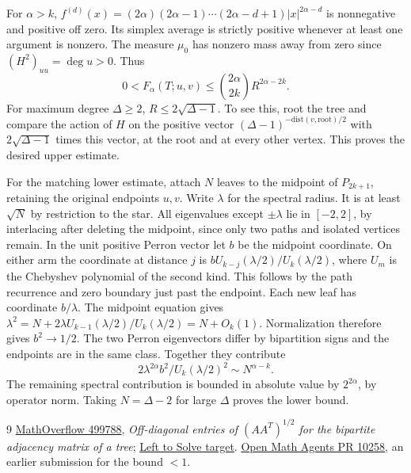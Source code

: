 \documentclass[11pt]{article}
\begin{document}
For $\alpha>k$, $f^{(d)}(x)=(2\alpha)(2\alpha-1)\cdots(2\alpha-d+1)|x|^{2\alpha-d}$ is nonnegative and positive off zero. Its simplex average is strictly positive whenever at least one argument is nonzero. The measure $\mu_0$ has nonzero mass away from zero since $(H^2)_{uu}=\deg u>0$. Thus
\[
 0<F_\alpha(T;u,v)\le {2\alpha\choose 2k} R^{2\alpha-2k}.
\]
For maximum degree $\Delta\ge2$, $R\le2\sqrt{\Delta-1}$. To see this, root the tree and compare the action of $H$ on the positive vector $(\Delta-1)^{-\mathrm{dist}(v,\mathrm{root})/2}$ with $2\sqrt{\Delta-1}$ times this vector, at the root and at every other vertex. This proves the desired upper estimate.

For the matching lower estimate, attach $N$ leaves to the midpoint of $P_{2k+1}$, retaining the original endpoints $u,v$. Write $\lambda$ for the spectral radius. It is at least $\sqrt N$ by restriction to the star. All eigenvalues except $\pm\lambda$ lie in $[-2,2]$, by interlacing after deleting the midpoint, since only two paths and isolated vertices remain. In the unit positive Perron vector let $b$ be the midpoint coordinate. On either arm the coordinate at distance $j$ is $b U_{k-j}(\lambda/2)/U_k(\lambda/2)$, where $U_m$ is the Chebyshev polynomial of the second kind. This follows by the path recurrence and zero boundary just past the endpoint. Each new leaf has coordinate $b/\lambda$. The midpoint equation gives $\lambda^2=N+2\lambda U_{k-1}(\lambda/2)/U_k(\lambda/2)=N+O_k(1)$. Normalization therefore gives $b^2\to1/2$. The two Perron eigenvectors differ by bipartition signs and the endpoints are in the same class. Together they contribute
\[
 2\lambda^{2\alpha} b^2/U_k(\lambda/2)^2\sim N^{\alpha-k}.
\]
The remaining spectral contribution is bounded in absolute value by $2^{2\alpha}$, by operator norm. Taking $N=\Delta-2$ for large $\Delta$ proves the lower bound.
\begin{thebibliography}{9}
 \href{https://mathoverflow.net/questions/499788}{MathOverflow 499788}, \emph{Off-diagonal entries of $(AA^T)^{1/2}$ for the bipartite adjacency matrix of a tree}; \href{https://lefttosolve.com/p/mo-499788}{Left to Solve target}.
 \href{https://github.com/GuillaumeBAUD-coder/open-math-agents/pull/10258}{Open Math Agents PR 10258}, an earlier submission for the bound $<1$.
\end{thebibliography}
\end{document}
